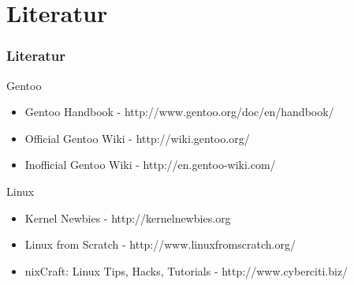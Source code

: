 \documentclass[utf8]{beamer}
\begin{document}
\section{Literatur}

\begin{frame}
\frametitle{Literatur}

\begin{block}{Gentoo}
  \begin{itemize}
  \item Gentoo Handbook - http://www.gentoo.org/doc/en/handbook/
  \item Official Gentoo Wiki - http://wiki.gentoo.org/
  \item Inofficial Gentoo Wiki - http://en.gentoo-wiki.com/
  \end{itemize}
\end{block}
\begin{block}{Linux}
  \begin{itemize}
  \item Kernel Newbies - http://kernelnewbies.org
  \item Linux from Scratch - http://www.linuxfromscratch.org/
  \item nixCraft: Linux Tips, Hacks, Tutorials - http://www.cyberciti.biz/
  \end{itemize}
\end{block}
\end{frame}
\end{document}
